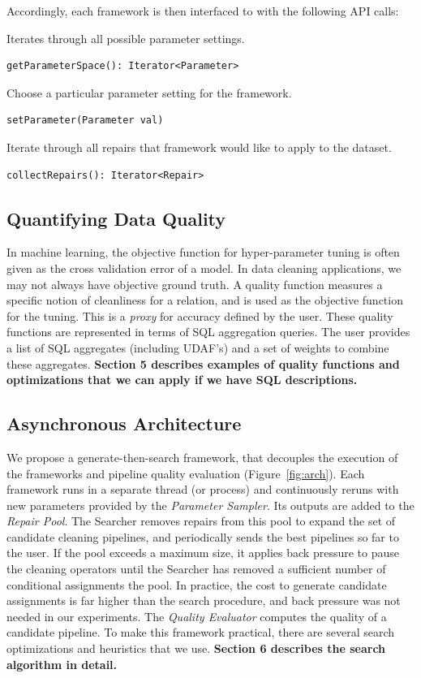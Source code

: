 Accordingly, each framework is then interfaced to \sys with the following API calls:

\vspace{0.5em}

\noindent Iterates through all possible parameter settings.
\begin{lstlisting}
getParameterSpace(): Iterator<Parameter>
\end{lstlisting}

\noindent Choose a particular parameter setting for the framework.
\begin{lstlisting}
setParameter(Parameter val)
\end{lstlisting}

\noindent Iterate through all repairs that framework would like to apply to the dataset.
\begin{lstlisting}
collectRepairs(): Iterator<Repair>
\end{lstlisting}

\subsection{Quantifying Data Quality}
In machine learning, the objective function for hyper-parameter tuning is often given as the cross validation error of a model. In data cleaning applications, we may not always have objective ground truth. 
A quality function measures a specific notion of cleanliness for a relation, and is used as the objective function for the tuning.  
This is a \emph{proxy} for accuracy defined by the user.
These quality functions are represented in terms of SQL aggregation queries. The user provides a list of SQL aggregates (including UDAF's) and a set of weights to combine these aggregates. 
\textbf{Section 5 describes examples of quality functions and optimizations that we can apply if we have SQL descriptions.}

\subsection{Asynchronous Architecture}
We propose a generate-then-search framework, that decouples the execution of the frameworks and pipeline quality evaluation (Figure~\ref{fig:arch}).  Each framework runs in a separate thread (or process) and continuously reruns with new parameters provided by the {\it Parameter Sampler}.   Its outputs are added to the {\it Repair Pool}.  The Searcher removes repairs from this pool to expand the set of candidate cleaning pipelines, and periodically sends the best pipelines so far to the user.   If the pool exceeds a maximum size, it applies back pressure to pause the cleaning operators until the Searcher has removed a sufficient number of conditional assignments the pool.  In practice, the cost to generate candidate assignments is far higher than the search procedure, and back pressure was not needed in our experiments.   The {\it Quality Evaluator} computes the quality of a candidate pipeline.
To make this framework practical, there are several search optimizations and heuristics that we use.
\textbf{Section 6 describes the search algorithm in detail.}


